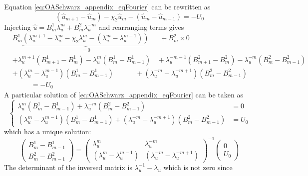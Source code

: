 \begin{subappendices}
\begin{itemize}
	Equation \eqref{eq:OASchwarz_appendix_eqFourier}
	can be rewritten as
	\begin{equation}
		(\widehat{u}_{m+1} - \widehat{u}_{m})
		-\chi_2 \widehat{u}_{m}
		- (\widehat{u}_{m} - \widehat{u}_{m-1})
		= -U_0
	\end{equation}
	Injecting $\widehat{u} = B^1_m \lambda_u^m +
	B^2_m \lambda_u^{-m}$ and rearranging terms gives
\begin{equation}
	\begin{aligned}
	&B^1_m \underbrace{\left(
		\lambda_u^{m+1} - \lambda_u^m - \chi_2 \lambda_u^m
		- (\lambda_u^{m} - \lambda_u^{m-1})
		\right)}_{=0} ~~~~~~~+ B^2_m \times 0 \\
	&+ \lambda_u^{m+1} (B_{m+1}^1 - B_m^1)
		- \lambda_u^{m} (B_{m}^1 - B_{m-1}^1)
		~~~~+ \lambda_u^{-m-1} (B_{m+1}^2 - B_m^2)
		- \lambda_u^{-m} (B_{m}^2 - B_{m-1}^2)
		\\
	&+ (\lambda_u^m - \lambda_u^{m-1})(B_{m}^1 - B_{m-1}^1)
		~~~~~~~~~~~~~~+ (\lambda_u^{-m} - \lambda_u^{-m+1})
				(B_{m}^2 - B_{m-1}^2)\\
		&~~~~~~~~~~~~= -U_0
	\end{aligned}
\end{equation}
A particular solution of \eqref{eq:OASchwarz_appendix_eqFourier}
can be taken as
\begin{equation}
\begin{cases}
	\lambda_u^m(B_m^1 - B_{m-1}^1)
	+ \lambda_u^{-m}(B_m^2 - B_{m-1}^2)&= 0 \\
	(\lambda_u^m - \lambda_u^{m-1})(B_m^1 - B_{m-1}^1)
	+ (\lambda_u^{-m} - \lambda_u^{-m+1})(B_m^2 - B_{m-1}^2)
	&= {U_0}
\end{cases}
\end{equation}
which has a unique solution:
\begin{equation}
	\begin{pmatrix}
B_m^1 - B_{m-1}^1\\
B_m^2 - B_{m-1}^2
	\end{pmatrix}
	=
	\begin{pmatrix}
		\lambda_u^m & \lambda_u^{-m} \\
		(\lambda_u^m - \lambda_u^{m-1})  & 
		(\lambda_u^{-m} - \lambda_u^{-m+1})
	\end{pmatrix}^{-1}
	\begin{pmatrix}
		0 \\ U_0
	\end{pmatrix}
\end{equation}
The determinant of the inversed matrix is
$\lambda_u^{-1} - \lambda_u$ which is not zero since

\end{itemize}
\end{subappendices}
